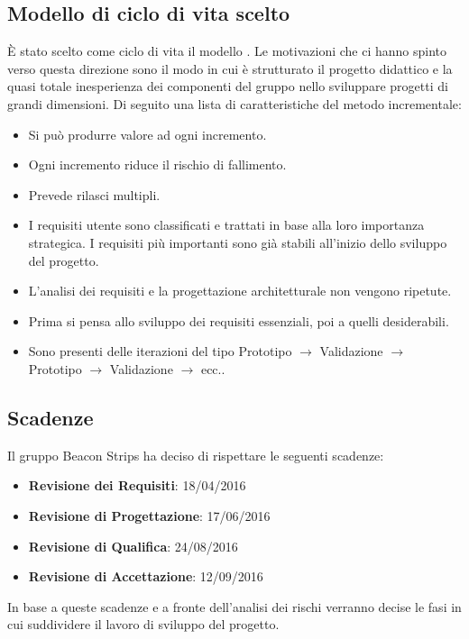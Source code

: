 	\subsection{Modello di ciclo di vita scelto}
	È stato scelto come ciclo di vita il modello . Le motivazioni che ci hanno spinto verso questa direzione sono il modo in cui è strutturato il progetto didattico e la quasi totale inesperienza dei componenti del gruppo nello sviluppare progetti  di grandi dimensioni. Di seguito una lista di caratteristiche del metodo incrementale:
	\begin{itemize}
		\item Si può produrre valore ad ogni incremento.
		\item Ogni incremento riduce il rischio di fallimento.
		\item Prevede rilasci multipli.
		\item I requisiti utente sono classificati e trattati in base alla loro importanza strategica. I requisiti più importanti sono già stabili all'inizio dello sviluppo del progetto.
		\item L'analisi dei requisiti e la progettazione architetturale non vengono ripetute.
		\item Prima si pensa allo sviluppo dei requisiti essenziali, poi a quelli desiderabili.
		\item Sono presenti delle iterazioni del tipo Prototipo $\rightarrow$ Validazione $\rightarrow$ Prototipo $\rightarrow$ Validazione $\rightarrow$ ecc..
	\end{itemize}
	\subsection{Scadenze}
	Il gruppo Beacon Strips ha deciso di rispettare le seguenti scadenze:
	\begin{itemize}
		\item \textbf{Revisione dei Requisiti}: 18/04/2016
		\item \textbf{Revisione di Progettazione}: 17/06/2016
		\item \textbf{Revisione di Qualifica}: 24/08/2016
		\item \textbf{Revisione di Accettazione}: 12/09/2016
	\end{itemize}
	In base a queste scadenze e a fronte dell'analisi dei rischi verranno decise le fasi in cui suddividere il lavoro di sviluppo del progetto.
	
	